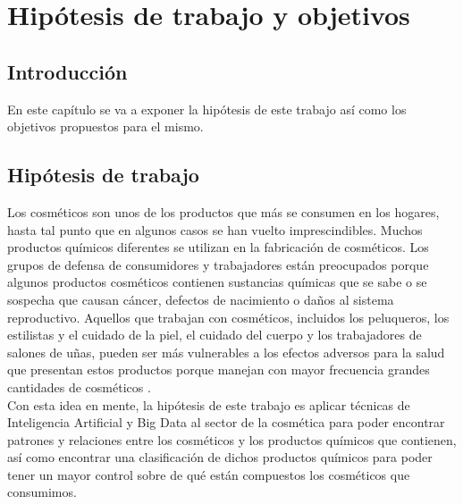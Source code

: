 
\chapter{Hipótesis de trabajo y objetivos} %
\label{chap:job-hypothesis} %


\section{Introducción}
En este capítulo se va a exponer la hipótesis de este trabajo así como los objetivos propuestos para el mismo.



\section{Hipótesis de trabajo}

Los cosméticos son unos de los productos que más se consumen en los hogares, hasta tal punto que en algunos casos se han vuelto imprescindibles. Muchos productos químicos diferentes se utilizan en la fabricación de cosméticos. Los grupos de defensa de consumidores y trabajadores están preocupados porque algunos productos cosméticos contienen sustancias químicas que se sabe o se sospecha que causan cáncer, defectos de nacimiento o daños al sistema reproductivo. Aquellos que trabajan con cosméticos, incluidos los peluqueros, los estilistas y el cuidado de la piel, el cuidado del cuerpo y los trabajadores de salones de uñas, pueden ser más vulnerables a los efectos adversos para la salud que presentan estos productos porque manejan con mayor frecuencia grandes cantidades de cosméticos \citep{dataset}. \\

Con esta idea en mente, la hipótesis de este trabajo es aplicar técnicas de Inteligencia Artificial y Big Data al sector de la cosmética para poder encontrar patrones y relaciones entre los cosméticos y los productos químicos que contienen, así como encontrar una clasificación de dichos productos químicos para poder tener un mayor control sobre de qué están compuestos los cosméticos que consumimos. \\




